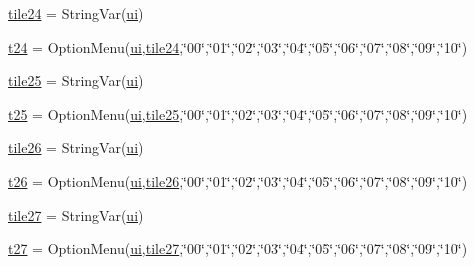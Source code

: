 \begin{DoxyCompactItemize}
\item 
\mbox{\hyperlink{namespacegui_a5f2cfe715c136f8cae1ea50bd8081a50}{tile24}} = String\+Var(\mbox{\hyperlink{namespacegui_a40ab7281456eadbea2dc2038f5c24fa1}{ui}})
\item 
\mbox{\hyperlink{namespacegui_a9757799e039723f8052236cdf71a2969}{t24}} = Option\+Menu(\mbox{\hyperlink{namespacegui_a40ab7281456eadbea2dc2038f5c24fa1}{ui}},\mbox{\hyperlink{namespacegui_a5f2cfe715c136f8cae1ea50bd8081a50}{tile24}},\char`\"{}00\char`\"{},\char`\"{}01\char`\"{},\char`\"{}02\char`\"{},\char`\"{}03\char`\"{},\char`\"{}04\char`\"{},\char`\"{}05\char`\"{},\char`\"{}06\char`\"{},\char`\"{}07\char`\"{},\char`\"{}08\char`\"{},\char`\"{}09\char`\"{},\char`\"{}10\char`\"{})
\item 
\mbox{\hyperlink{namespacegui_ada98a88ba76a04678da5fdeaca867b97}{tile25}} = String\+Var(\mbox{\hyperlink{namespacegui_a40ab7281456eadbea2dc2038f5c24fa1}{ui}})
\item 
\mbox{\hyperlink{namespacegui_ae1141f1a24ac74ede448124148f59af0}{t25}} = Option\+Menu(\mbox{\hyperlink{namespacegui_a40ab7281456eadbea2dc2038f5c24fa1}{ui}},\mbox{\hyperlink{namespacegui_ada98a88ba76a04678da5fdeaca867b97}{tile25}},\char`\"{}00\char`\"{},\char`\"{}01\char`\"{},\char`\"{}02\char`\"{},\char`\"{}03\char`\"{},\char`\"{}04\char`\"{},\char`\"{}05\char`\"{},\char`\"{}06\char`\"{},\char`\"{}07\char`\"{},\char`\"{}08\char`\"{},\char`\"{}09\char`\"{},\char`\"{}10\char`\"{})
\item 
\mbox{\hyperlink{namespacegui_a6f5755e2ff302976b2d5a7a6973255ce}{tile26}} = String\+Var(\mbox{\hyperlink{namespacegui_a40ab7281456eadbea2dc2038f5c24fa1}{ui}})
\item 
\mbox{\hyperlink{namespacegui_a4762a20efce980eb91ef00a29911348e}{t26}} = Option\+Menu(\mbox{\hyperlink{namespacegui_a40ab7281456eadbea2dc2038f5c24fa1}{ui}},\mbox{\hyperlink{namespacegui_a6f5755e2ff302976b2d5a7a6973255ce}{tile26}},\char`\"{}00\char`\"{},\char`\"{}01\char`\"{},\char`\"{}02\char`\"{},\char`\"{}03\char`\"{},\char`\"{}04\char`\"{},\char`\"{}05\char`\"{},\char`\"{}06\char`\"{},\char`\"{}07\char`\"{},\char`\"{}08\char`\"{},\char`\"{}09\char`\"{},\char`\"{}10\char`\"{})
\item 
\mbox{\hyperlink{namespacegui_a766749c4e7c91af5ead73f0964a5f8d6}{tile27}} = String\+Var(\mbox{\hyperlink{namespacegui_a40ab7281456eadbea2dc2038f5c24fa1}{ui}})
\item 
\mbox{\hyperlink{namespacegui_afbda87fbb8eb9a386ce9c42ba97ce8c5}{t27}} = Option\+Menu(\mbox{\hyperlink{namespacegui_a40ab7281456eadbea2dc2038f5c24fa1}{ui}},\mbox{\hyperlink{namespacegui_a766749c4e7c91af5ead73f0964a5f8d6}{tile27}},\char`\"{}00\char`\"{},\char`\"{}01\char`\"{},\char`\"{}02\char`\"{},\char`\"{}03\char`\"{},\char`\"{}04\char`\"{},\char`\"{}05\char`\"{},\char`\"{}06\char`\"{},\char`\"{}07\char`\"{},\char`\"{}08\char`\"{},\char`\"{}09\char`\"{},\char`\"{}10\char`\"{})

\end{DoxyCompactItemize}
